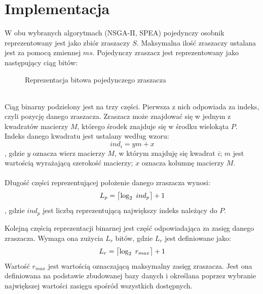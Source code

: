 \documentclass[twoside]{iisthesis}
\begin{document}
\section{Implementacja}
W obu wybranych algorytmach (NSGA-II, SPEA) pojedynczy osobnik reprezentowany jest jako zbiór zraszaczy $S$. Maksymalna ilość zraszaczy ustalana jest za pomocą zmiennej $ms$. Pojedynczy zraszacz jest reprezentowany jako następujący ciąg bitów:
\begin{figure}[!htb]
	\centering
	\caption{Reprezentacja bitowa pojedynczego zraszacza}
	\label{fig:sprinkler_bin_repr}
\end{figure}
\\Ciąg binarny podzielony jest na trzy części. Pierwsza z nich odpowiada za indeks, czyli pozycję danego zraszacza. Zraszacz może znajdować się w jednym z kwadratów macierzy $M$, którego środek znajduje się w środku wielokąta $P$. Indeks danego kwadratu jest ustalany według wzoru:
\begin{equation}
	ind_{i} = y m + x
\end{equation}
, gdzie $y$ oznacza wierz macierzy $M$, w którym znajduję się kwadrat $i$; $m$ jest wartością wyrażającą szerokość macierzy; $x$ oznacza kolumnę macierzy $M$.\\\\
Długość części reprezentującej położenie danego zraszacza wynosi:
\DeclarePairedDelimiter{\ceil}{\lceil}{\rceil}
\begin{equation}
	L_{p} = \ceil[\big]{\log_{2} \text{ } ind_{p}} + 1
\end{equation}
, gdzie $ind_p$ jest liczbą reprezentującą największy indeks należący do $P$.

Kolejną częścią reprezentacji binarnej jest część odpowiadająca za zasięg danego zraszacza. Wymaga ona zużycia $L_{r}$ bitów, gdzie $L_{r}$ jest definiowane jako:
\begin{equation}
	L_{r} = \ceil[\big]{\log_{2} \text{ } r_{max}} + 1
\end{equation}
Wartość $r_{max}$ jest wartością oznaczającą maksymalny zasięg zraszacza. Jest ona definiowana na podstawie zbudowanej bazy danych i określana poprzez wybranie największej wartości zasięgu spośród wszystkich dostępnych.
\end{document}
